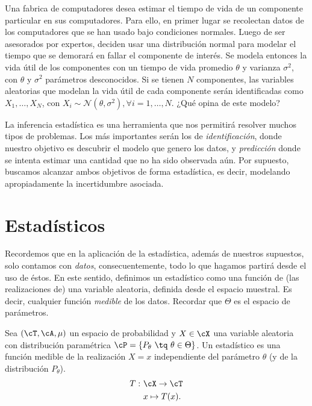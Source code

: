 \begin{example}
Una fabrica de computadores desea estimar el tiempo de vida de un componente particular en sus computadores. Para ello, en primer lugar se recolectan datos de los computadores que se han usado bajo condiciones normales. Luego de ser asesorados por expertos, deciden usar una distribución normal para modelar el tiempo que se demorará en fallar el componente de interés. Se modela entonces la vida útil de los componentes con un tiempo de vida promedio $\theta$ y varianza $\sigma^2$, con $\theta$ y $\sigma^{2}$  parámetros desconocidos. Si se tienen $N$ componentes, las variables aleatorias que modelan la vida útil de cada componente serán identificadas como 
$X_1,\ldots,X_N$, con $X_i \sim \mathcal{N}(\theta,\sigma^{2}), \forall i=1,\ldots,N$. ¿Qué opina de este modelo?
\end{example}

La inferencia estadística es una herramienta que nos permitirá resolver muchos tipos de problemas. Los más importantes serán los de \emph{identificación}, donde nuestro objetivo es descubrir el modelo que genero los datos, y \emph{predicción} donde se intenta estimar una cantidad que no ha sido observada aún. Por supuesto, buscamos alcanzar ambos objetivos de forma estadística, es decir,  modelando apropiadamente la incertidumbre asociada.

\section{Estadísticos}


Recordemos que en la aplicación de la estadística, además de nuestros supuestos, solo contamos con \emph{datos}, consecuentemente, todo lo que hagamos partirá desde el uso de éstos. En este sentido, definimos un estadístico como una función de (las realizaciones de) una variable aleatoria, definida desde el espacio muestral. Es decir, cualquier función \emph{medible} de los datos. Recordar que $\Theta$ es el espacio de parámetros.\\ 


\begin{definition}[Estadístico]
\label{def:estadístico}
Sea $(\cT,\cA,\mu)$ un espacio de probabilidad y $X\in\cX$ una variable aleatoria con distribución paramétrica $\cP = \{P_\theta\ \tq\ \theta\in\Theta\}$. Un estadístico es una función medible de la realización $X=x$ independiente del parámetro $\theta$ (y de la distribución $P_\theta$).
\begin{align}
\nonumber
	T:\ &\cX \rightarrow \cT\\
\nonumber
	&x\mapsto T(x).
\end{align} 

\end{definition}


